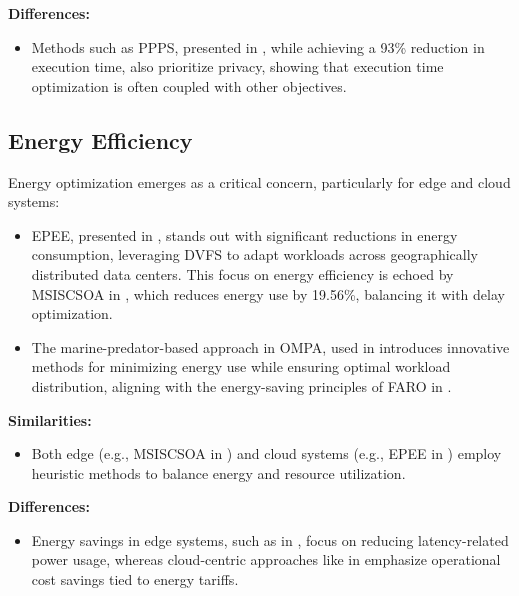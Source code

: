 \documentclass[a4paper, final]{article}
\begin{document}
\noindent \textbf{Differences:}
\begin{itemize}
    \item Methods such as PPPS, presented in \cite{bib:7_ppps}, while achieving a 93\% reduction in execution time, 
    also prioritize privacy, showing that execution time optimization is often coupled with other objectives.
\end{itemize}

\subsection{Energy Efficiency}
Energy optimization emerges as a critical concern, particularly for edge and cloud systems:
\begin{itemize}
    \item EPEE, presented in \cite{bib:5_epee}, stands out with significant reductions in energy consumption, 
    leveraging DVFS to adapt workloads across geographically distributed data centers. This focus on 
    energy efficiency is echoed by MSISCSOA in \cite{bib:3_sandcat}, which reduces energy use by 19.56\%, balancing it with 
    delay optimization.

    \item The marine-predator-based approach in OMPA, used in \cite{bib:6_marine} introduces innovative 
    methods for minimizing energy use while ensuring optimal workload distribution, aligning with the 
    energy-saving principles of FARO in \cite{bib:2_faro}.
\end{itemize}

\noindent \textbf{Similarities:}
\begin{itemize}
    \item Both edge (e.g., MSISCSOA in \cite{bib:3_sandcat}) and cloud systems (e.g., EPEE in 
    \cite{bib:5_epee}) employ heuristic methods to balance energy and resource utilization.
\end{itemize}

\noindent \textbf{Differences:}
\begin{itemize}
    \item Energy savings in edge systems, such as in \cite{bib:3_sandcat}, focus on reducing latency-related 
    power usage, whereas cloud-centric approaches like in \cite{bib:5_epee} emphasize operational cost 
    savings tied to energy tariffs.
\end{itemize}
\end{document}
